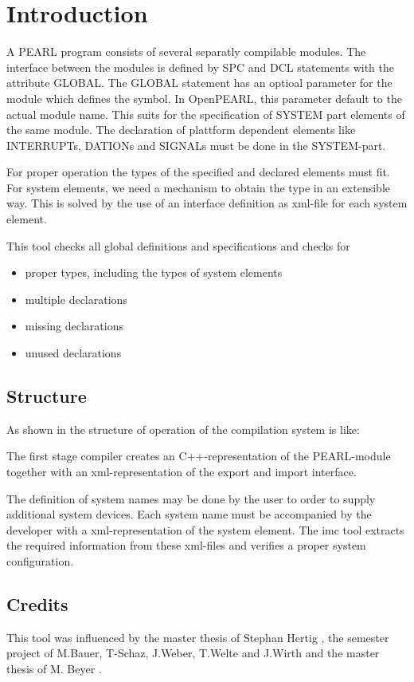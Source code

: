 \chapter{Introduction}
A PEARL program consists of several separatly compilable modules.
The interface between the modules is defined by SPC and DCL statements with the
attribute GLOBAL.
The GLOBAL statement has an optioal parameter for the module which defines the symbol.
In OpenPEARL, this parameter default to the actual module name. This suits for the specification
of SYSTEM part elements of the same module. 
The declaration of plattform dependent elements like INTERRUPTs, 
DATIONs and SIGNALs must be done in the SYSTEM-part.

For proper operation the types of the specified and declared elements must
fit. 
For system elements, we need a mechanism to obtain the type in an
extensible way. This is solved by the use of an interface definition as 
xml-file for each system element.

This tool checks all global definitions and specifications and checks for
\begin{itemize}
\item proper types, including the types of system elements
\item multiple declarations
\item missing declarations
\item unused declarations
\end{itemize}

\section{Structure}
As shown in \cite{mueller2016} the structure of operation of the \OpenPEARL{}
compilation system is like:


The first stage compiler creates an C++-representation of the PEARL-module
together with an xml-representation of the export and import interface.

The definition of system names may be done by the user to order to supply 
additional system devices.
Each system name must be accompanied by the developer with a xml-representation
of the system element. The imc tool extracts the required information
from these xml-files and verifies a proper system configuration.

\section{Credits}
This tool  was influenced by the master thesis of 
Stephan Hertig \cite{msc_hertwig}, the semester project of
M.Bauer, T-Schaz, J.Weber, T.Welte and J.Wirth \cite{openpearlss16} and
the master thesis of M. Beyer \cite{msc_beyer}.


